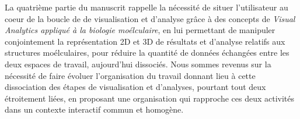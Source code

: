 {%



La quatrième partie du manuscrit rappelle la nécessité de situer l'utilisateur au coeur de la boucle de de visualisation et d'analyse grâce à des concepts de \textit{Visual Analytics appliqué à la biologie moélculaire}, en lui permettant de manipuler conjointement la représentation 2D et 3D de résultats et d'analyse relatifs aux structures moélculaires, pour réduire la quantité de données échangées entre les deux espaces de travail, aujourd'hui dissociés. Nous sommes revenus sur la nécessité de faire évoluer l'organisation du travail donnant lieu à cette dissociation des étapes de visualisation et d'analyses, pourtant tout deux étroitement liées, en proposant une organisation qui rapproche ces deux activités dans un contexte interactif commun et homogène.

}
